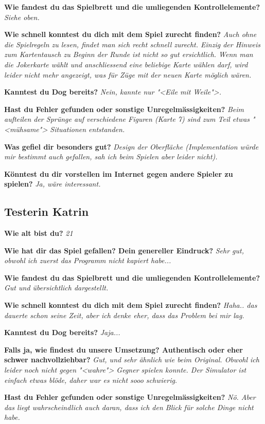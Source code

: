 \documentclass[12pt,halfparskip]{scrartcl}
\begin{document}
\textbf{Wie fandest du das Spielbrett und die umliegenden Kontrollelemente?}
\emph{Siehe oben.}

\textbf{Wie schnell konntest du dich mit dem Spiel zurecht finden?}
\emph{Auch ohne die Spielregeln zu lesen, findet man sich recht schnell zurecht. Einzig der Hinweis zum Kartentausch zu Beginn der Runde ist nicht so gut ersichtlich. Wenn man die Jokerkarte wählt und anschliessend eine beliebige Karte wählen darf, wird leider nicht mehr angezeigt, was für Züge mit der neuen Karte möglich wären.}

\textbf{Kanntest du Dog bereits?}
\emph{Nein, kannte nur "<Eile mit Weile">.}

\textbf{Hast du Fehler gefunden oder sonstige Unregelmässigkeiten?}
\emph{Beim aufteilen der Sprünge auf verschiedene Figuren (Karte 7) sind zum Teil etwas "<mühsame"> Situationen entstanden.}

\textbf{Was gefiel dir besonders gut?}
\emph{Design der Oberfläche (Implementation würde mir bestimmt auch gefallen, sah ich beim Spielen aber leider nicht).}

\textbf{Könntest du dir vorstellen im Internet gegen andere Spieler zu spielen?}
\emph{Ja, wäre interessant.}

\subsection{Testerin Katrin}
\textbf{Wie alt bist du?}
\emph{21}

\textbf{Wie hat dir das Spiel gefallen? Dein genereller Eindruck?}
\emph{Sehr gut, obwohl ich zuerst das Programm nicht kapiert habe...}

\textbf{Wie fandest du das Spielbrett und die umliegenden Kontrollelemente?}
\emph{Gut und übersichtlich dargestellt.}

\textbf{Wie schnell konntest du dich mit dem Spiel zurecht finden?}
\emph{Haha.. das dauerte schon seine Zeit, aber ich denke eher, dass das Problem bei mir lag.}

\textbf{Kanntest du Dog bereits?}
\emph{Jaja...}

\textbf{Falls ja, wie findest du unsere Umsetzung? Authentisch oder eher schwer nachvollziehbar?}
\emph{Gut, und sehr ähnlich wie beim Original. Obwohl ich leider noch nicht gegen "<wahre"> Gegner spielen konnte. Der Simulator ist einfach etwas blöde, daher war es nicht sooo schwierig.}

\textbf{Hast du Fehler gefunden oder sonstige Unregelmässigkeiten?}
\emph{Nö. Aber das liegt wahrscheindlich auch daran, dass ich den Blick für solche Dinge nicht habe.}
\end{document}
